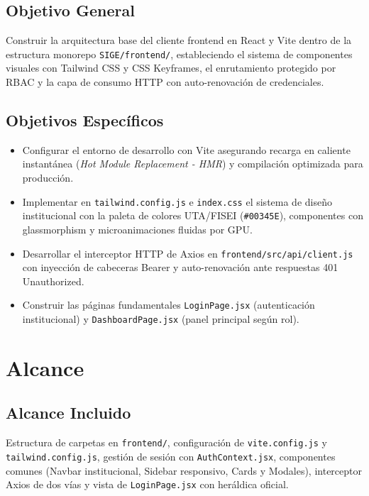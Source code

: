 \documentclass[12pt,a4paper]{article}
\begin{document}
\subsection{Objetivo General}
Construir la arquitectura base del cliente frontend en React y Vite dentro de la estructura monorepo \texttt{SIGE/frontend/}, estableciendo el sistema de componentes visuales con Tailwind CSS y CSS Keyframes, el enrutamiento protegido por RBAC y la capa de consumo HTTP con auto-renovación de credenciales.

\subsection{Objetivos Específicos}
\begin{itemize}[leftmargin=1.5em, itemsep=1.5pt, topsep=1.5pt]
    \item Configurar el entorno de desarrollo con Vite asegurando recarga en caliente instantánea (\textit{Hot Module Replacement - HMR}) y compilación optimizada para producción.
    \item Implementar en \texttt{tailwind.config.js} e \texttt{index.css} el sistema de diseño institucional con la paleta de colores UTA/FISEI (\texttt{\#00345E}), componentes con glassmorphism y microanimaciones fluidas por GPU.
    \item Desarrollar el interceptor HTTP de Axios en \texttt{frontend/src/api/client.js} con inyección de cabeceras Bearer y auto-renovación ante respuestas 401 Unauthorized.
    \item Construir las páginas fundamentales \texttt{LoginPage.jsx} (autenticación institucional) y \texttt{DashboardPage.jsx} (panel principal según rol).
\end{itemize}

\section{Alcance}

\subsection{Alcance Incluido}
Estructura de carpetas en \texttt{frontend/}, configuración de \texttt{vite.config.js} y \texttt{tailwind.config.js}, gestión de sesión con \texttt{AuthContext.jsx}, componentes comunes (Navbar institucional, Sidebar responsivo, Cards y Modales), interceptor Axios de dos vías y vista de \texttt{LoginPage.jsx} con heráldica oficial.
\end{document}
